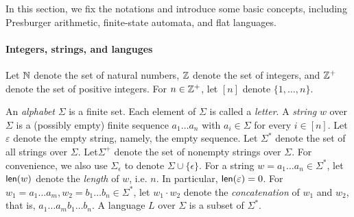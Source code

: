 

In this section, we fix the notations and introduce some basic concepts, including Presburger arithmetic, finite-state automata, and flat languages.

\paragraph{Integers, strings, and languges}
Let $\mathbb{N}$ denote the set of natural numbers, $\mathbb{Z}$ denote the set of integers, and $\mathbb{Z}^+$ denote the set of positive integers. For $n \in \mathbb{Z}^+$, let $[n]$ denote $\{1,\dots,n\}$.

An \emph{alphabet} $\Sigma$ is a finite set. Each element of $\Sigma$ is called a \emph{letter}.
A \emph{string} $w$ over $\Sigma$ is a (possibly empty) finite sequence $a_1\ldots a_n$ with $a_i \in \Sigma$ for every $i \in [n]$. Let $\varepsilon$ denote the empty string, namely, the empty sequence. 
Let $\Sigma^*$ denote the set of all strings over $\Sigma$.
Let$\Sigma^+$ denote the set of nonempty strings over $\Sigma$. 
For convenience, we also use $\Sigma_{\epsilon}$ to denote $\Sigma \cup \{\epsilon\}$.
For a string $w = a_1 \ldots a_n \in \Sigma^*$, let $\textsf{len}(w)$ denote the \emph{length} of $w$, i.e. $n$. In particular, $\textsf{len}(\varepsilon)  = 0$.
%
For $w_1 = a_1 \ldots a_m, w_2 = b_1 \ldots b_n\in \Sigma^*$, 
let $w_1\cdot w_2$ denote the \emph{concatenation} of $w_1$ and $w_2$, that is, $a_1 \ldots a_m b_1 \ldots b_n$.
%
A language $L$ over $\Sigma$ is a subset of $\Sigma^*$.

